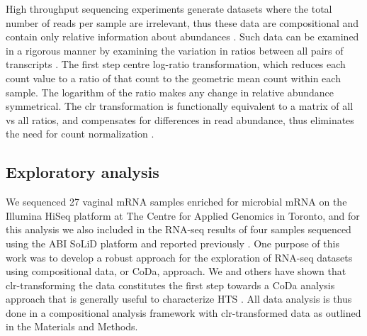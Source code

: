 \documentclass[10pt,letterpaper]{article}
\begin{document}
High throughput sequencing experiments generate datasets where the total number of reads per sample are irrelevant, thus these data are compositional and contain only relative information about abundances \cite{fernandes:2014}. Such data can be examined in a rigorous manner by examining the variation in ratios between all pairs of transcripts \cite{Aitchison:1986, pawlowsky2015modeling,pawlowsky2011compositional}.  The first step  centre log-ratio transformation, which reduces each count value to a ratio of that count to the geometric mean count within each sample. The logarithm of the ratio makes any change in relative abundance symmetrical. The clr transformation is functionally equivalent to a matrix of all vs all ratios, and  compensates for differences in read abundance, thus eliminates the need for count normalization \cite{Lovell:2015}.  


\subsection{Exploratory analysis}
We sequenced 27 vaginal  mRNA samples enriched for microbial mRNA on the Illumina HiSeq platform at The Centre for Applied Genomics in Toronto, and for this analysis we also included in the RNA-seq results of four samples sequenced using the ABI SoLiD platform and reported previously \cite{macklaim:2013}. One purpose of this work was to develop a robust approach for the exploration of RNA-seq datasets using compositional data, or CoDa, approach.  We and others have shown that clr-transforming the data constitutes the first step towards a CoDa analysis approach that is generally useful  to characterize HTS \cite{Friedman:2012, fernandes:2013,fernandes:2014,Lovell:2015}. All data analysis is thus done in a compositional analysis framework with clr-transformed data as outlined in the Materials and Methods.
\end{document}
